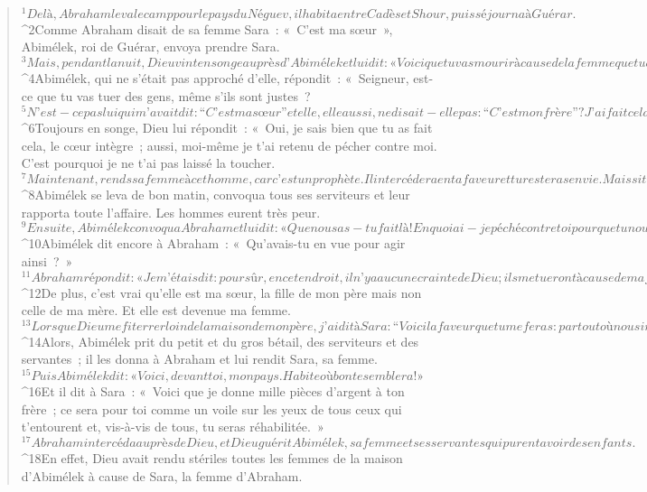   
  
      
         
      \bchapter{}
      \begin{verse}
${}^{1}De là, Abraham leva le camp pour le pays du Néguev, il habita entre Cadès et Shour, puis séjourna à Guérar. 
${}^{2}Comme Abraham disait de sa femme Sara : « C’est ma sœur », Abimélek, roi de Guérar, envoya prendre Sara. 
${}^{3}Mais, pendant la nuit, Dieu vint en songe auprès d’Abimélek et lui dit : « Voici que tu vas mourir à cause de la femme que tu as prise, car elle est mariée. » 
${}^{4}Abimélek, qui ne s’était pas approché d’elle, répondit : « Seigneur, est-ce que tu vas tuer des gens, même s’ils sont justes ? 
${}^{5}N’est-ce pas lui qui m’avait dit : “C’est ma sœur” et elle, elle aussi, ne disait-elle pas : “C’est mon frère” ? J’ai fait cela, le cœur intègre et les mains innocentes. » 
${}^{6}Toujours en songe, Dieu lui répondit : « Oui, je sais bien que tu as fait cela, le cœur intègre ; aussi, moi-même je t’ai retenu de pécher contre moi. C’est pourquoi je ne t’ai pas laissé la toucher. 
${}^{7}Maintenant, rends sa femme à cet homme, car c’est un prophète. Il intercédera en ta faveur et tu resteras en vie. Mais si tu ne rends pas la femme, sache qu’il te faudra mourir, toi et tous les tiens. »
${}^{8}Abimélek se leva de bon matin, convoqua tous ses serviteurs et leur rapporta toute l’affaire. Les hommes eurent très peur. 
${}^{9}Ensuite, Abimélek convoqua Abraham et lui dit : « Que nous as-tu fait là ! En quoi ai-je péché contre toi pour que tu nous aies exposés, moi et mon royaume, à un si grave péché ? Tu as fait à mon égard une chose qui ne se fait pas ! » 
${}^{10}Abimélek dit encore à Abraham : « Qu’avais-tu en vue pour agir ainsi ? » 
${}^{11}Abraham répondit : « Je m’étais dit : pour sûr, en cet endroit, il n’y a aucune crainte de Dieu ; ils me tueront à cause de ma femme. 
${}^{12}De plus, c’est vrai qu’elle est ma sœur, la fille de mon père mais non celle de ma mère. Et elle est devenue ma femme. 
${}^{13}Lorsque Dieu me fit errer loin de la maison de mon père, j’ai dit à Sara : “Voici la faveur que tu me feras : partout où nous irons, dis de moi : C’est mon frère.” »
${}^{14}Alors, Abimélek prit du petit et du gros bétail, des serviteurs et des servantes ; il les donna à Abraham et lui rendit Sara, sa femme. 
${}^{15}Puis Abimélek dit : « Voici, devant toi, mon pays. Habite où bon te semblera ! » 
${}^{16}Et il dit à Sara : « Voici que je donne mille pièces d’argent à ton frère ; ce sera pour toi comme un voile sur les yeux de tous ceux qui t’entourent et, vis-à-vis de tous, tu seras réhabilitée. »
${}^{17}Abraham intercéda auprès de Dieu, et Dieu guérit Abimélek, sa femme et ses servantes qui purent avoir des enfants. 
${}^{18}En effet, Dieu avait rendu stériles toutes les femmes de la maison d’Abimélek à cause de Sara, la femme d’Abraham.
      

\end{verse}
